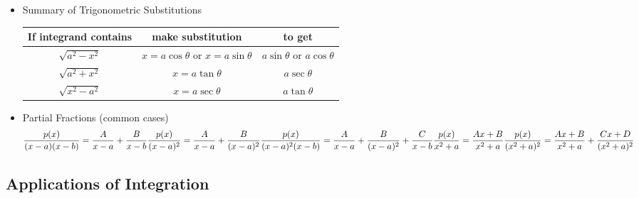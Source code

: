 \begin{itemize}
\begin{enumerate}
\begin{equation}
					\end{equation}
			\end{enumerate}
		\item Summary of Trigonometric Substitutions
			\begin{center} \begin{tabular}{|c|c|c|} \hline
				\textbf{If integrand contains} & \textbf{make substitution} & \textbf{to get} \\ \hline
				$\sqrt{a^2-x^2}$ & $x=a \cos \theta$ or $x=a \sin \theta$ & $a \sin \theta$ or $a \cos \theta$ \\ \hline
				$\sqrt{a^2 +x^2}$ & $x=a \tan \theta$ & $a \sec \theta$ \\ \hline
				$\sqrt{x^2-a^2}$ & $x=a \sec \theta$ & $a \tan \theta$ \\ \hline
			\end{tabular} \end{center}
		\item Partial Fractions (common cases)
			\begin{equation}
				\frac{p(x)}{(x-a)(x-b)} = \frac{A}{x-a} + \frac{B}{x-b} \\
				\frac{p(x)}{(x-a)^2} = \frac{A}{x-a}+\frac{B}{(x-a)^2} \\
				\frac{p(x)}{(x-a)^2(x-b)} = \frac{A}{x-a}+\frac{B}{(x-a)^2}+\frac{C}{x-b} \\
				\frac{p(x)}{x^2+a} = \frac{A x + B}{x^2 + a} \\
				\frac{p(x)}{(x^2+a)^2} = \frac{A x + B}{x^2+a} + \frac{Cx+D}{(x^2+a)^2}
			\end{equation}
	\end{itemize}
\subsection{Applications of Integration}
